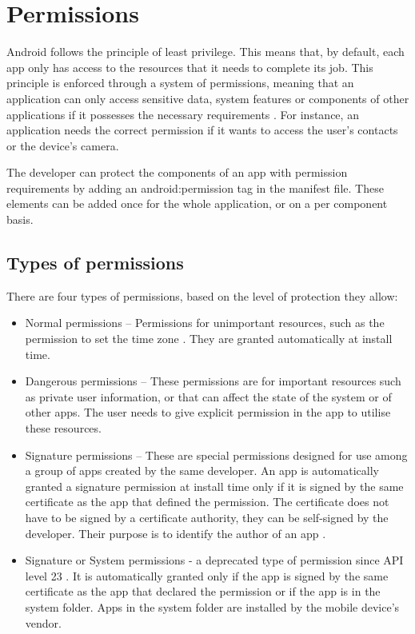     \section{Permissions}
        \label{sec:permissions}
        
    Android follows the principle of least privilege. This means that, by default, each app only has access to the resources that it needs to complete its job. This principle is enforced through a system of permissions, meaning that an application can only access sensitive data, system features or components of other applications if it possesses the necessary requirements \cite{permissions_guide}. For instance, an application needs the correct permission if it wants to access the user’s contacts or the device’s camera.
    
    The developer can protect the components of an app with permission requirements by adding an android:permission tag in the manifest file. These elements can be added once for the whole application, or on a per component basis.
    
    \subsection{Types of permissions}
        \label{subsec:types_of_permissions}
        
    There are four types of permissions, based on the level of protection they allow:
    
    \begin{itemize}
        \item Normal permissions – Permissions for unimportant resources, such as the permission to set the time zone \cite{permissions_guide}. They are granted automatically at install time.
        \item Dangerous permissions – These permissions are for important resources such as private user information, or that can affect the state of the system or of other apps. The user needs to give explicit permission in the app to utilise these resources.
        \item Signature permissions – These are special permissions designed for use among a group of apps created by the same developer. An app is automatically granted a signature permission at install time only if it is signed by the same certificate as the app that defined the permission. The certificate does not have to be signed by a certificate authority, they can be self-signed by the developer. Their purpose is to identify the author of an app \cite{define_custom_permissions}.
        \item Signature or System permissions - a deprecated type of permission since API level 23 \cite{manifest_permissions_element}. It is automatically granted only if the app is signed by the same certificate as the app that declared the permission or if the app is in the system folder. Apps in the system folder are installed by the mobile device’s vendor.
    \end{itemize}
    
